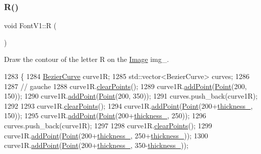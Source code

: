\subsubsection{\texorpdfstring{R()}{R()}}
{\footnotesize\ttfamily void Font\+V1\+::R (\begin{DoxyParamCaption}{ }\end{DoxyParamCaption})}



Draw the contour of the letter R on the \mbox{\hyperlink{class_image}{Image}} img\+\_\+. 


\begin{DoxyCode}
1283               \{
1284     \mbox{\hyperlink{class_bezier_curve}{BezierCurve}} curve1R;
1285     std::vector<BezierCurve> curves;
1286 
1287     \textcolor{comment}{// gauche}
1288     curve1R.\mbox{\hyperlink{class_bezier_curve_a0ba8ce66d5af5971ae6a1b506029728e}{clearPoints}}();
1289     curve1R.\mbox{\hyperlink{class_bezier_curve_a38d16c18b36ae45619b05e26e226cf34}{addPoint}}(\mbox{\hyperlink{class_point}{Point}}(200, 150));
1290     curve1R.\mbox{\hyperlink{class_bezier_curve_a38d16c18b36ae45619b05e26e226cf34}{addPoint}}(\mbox{\hyperlink{class_point}{Point}}(200, 350));
1291     curves.push\_back(curve1R);
1292 
1293     curve1R.\mbox{\hyperlink{class_bezier_curve_a0ba8ce66d5af5971ae6a1b506029728e}{clearPoints}}();
1294     curve1R.\mbox{\hyperlink{class_bezier_curve_a38d16c18b36ae45619b05e26e226cf34}{addPoint}}(\mbox{\hyperlink{class_point}{Point}}(200+\mbox{\hyperlink{class_font_v1_aed8040e76be9a52833627b92f0fb4e5f}{thickness\_}}, 150));
1295     curve1R.\mbox{\hyperlink{class_bezier_curve_a38d16c18b36ae45619b05e26e226cf34}{addPoint}}(\mbox{\hyperlink{class_point}{Point}}(200+\mbox{\hyperlink{class_font_v1_aed8040e76be9a52833627b92f0fb4e5f}{thickness\_}}, 250));
1296     curves.push\_back(curve1R);
1297 
1298     curve1R.\mbox{\hyperlink{class_bezier_curve_a0ba8ce66d5af5971ae6a1b506029728e}{clearPoints}}();
1299     curve1R.\mbox{\hyperlink{class_bezier_curve_a38d16c18b36ae45619b05e26e226cf34}{addPoint}}(\mbox{\hyperlink{class_point}{Point}}(200+\mbox{\hyperlink{class_font_v1_aed8040e76be9a52833627b92f0fb4e5f}{thickness\_}}, 250+\mbox{\hyperlink{class_font_v1_aed8040e76be9a52833627b92f0fb4e5f}{thickness\_}}));
1300     curve1R.\mbox{\hyperlink{class_bezier_curve_a38d16c18b36ae45619b05e26e226cf34}{addPoint}}(\mbox{\hyperlink{class_point}{Point}}(200+\mbox{\hyperlink{class_font_v1_aed8040e76be9a52833627b92f0fb4e5f}{thickness\_}}, 350-\mbox{\hyperlink{class_font_v1_aed8040e76be9a52833627b92f0fb4e5f}{thickness\_}}));

\end{DoxyCode}
